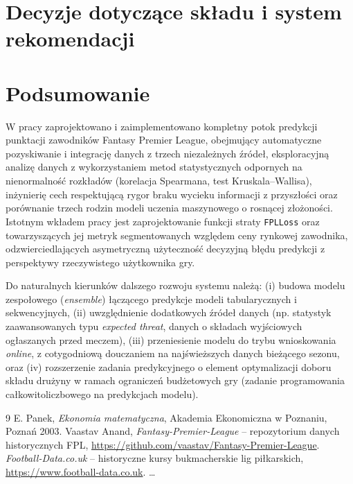 \documentclass[a4paper,twoside,11pt]{mwrep}
\theoremstyle{plain} \newtheorem{thm}{Twierdzenie}
\theoremstyle{plain} \newtheorem{lem}{Lemat}
\theoremstyle{definition} \newtheorem{defn}{Definicja}
\theoremstyle{remark} \newtheorem*{rem}{Wniosek}
\begin{document}
\chapter{Decyzje dotyczące składu i system rekomendacji}\label{ch:recommender}
\chapter*{Podsumowanie}

W pracy zaprojektowano i zaimplementowano kompletny potok predykcji
punktacji zawodników Fantasy Premier League, obejmujący automatyczne
pozyskiwanie i integrację danych z trzech niezależnych źródeł,
eksploracyjną analizę danych z wykorzystaniem metod statystycznych
odpornych na nienormalność rozkładów (korelacja Spearmana, test
Kruskala–Wallisa), inżynierię cech respektującą rygor braku wycieku
informacji z przyszłości oraz porównanie trzech rodzin modeli uczenia
maszynowego o rosnącej złożoności. Istotnym wkładem pracy jest
zaprojektowanie funkcji straty \texttt{FPLLoss} oraz towarzyszących jej
metryk segmentowanych względem ceny rynkowej zawodnika, odzwierciedlających
asymetryczną użyteczność decyzyjną błędu predykcji z perspektywy
rzeczywistego użytkownika gry.

Do naturalnych kierunków dalszego rozwoju systemu należą: (i) budowa
modelu zespołowego (\emph{ensemble}) łączącego predykcje modeli
tabularycznych i sekwencyjnych, (ii) uwzględnienie dodatkowych źródeł
danych (np. statystyk zaawansowanych typu \emph{expected threat},
danych o składach wyjściowych ogłaszanych przed meczem), (iii)
przeniesienie modelu do trybu wnioskowania \emph{online}, z cotygodniową
douczaniem na najświeższych danych bieżącego sezonu, oraz (iv)
rozszerzenie zadania predykcyjnego o element optymalizacji doboru składu
drużyny w ramach ograniczeń budżetowych gry (zadanie programowania
całkowitoliczbowego na predykcjach modelu).

 \begin{thebibliography}{9}
 E. Panek, \emph{Ekonomia matematyczna}, Akademia Ekonomiczna w Poznaniu,
 Poznań 2003.
 Vaastav Anand, \emph{Fantasy-Premier-League} -- repozytorium danych
 historycznych FPL, \url{https://github.com/vaastav/Fantasy-Premier-League}.
 \emph{Football-Data.co.uk} -- historyczne kursy bukmacherskie lig
 piłkarskich, \url{https://www.football-data.co.uk}.
 \ldots
 \end{thebibliography}
  
 
\end{document}
